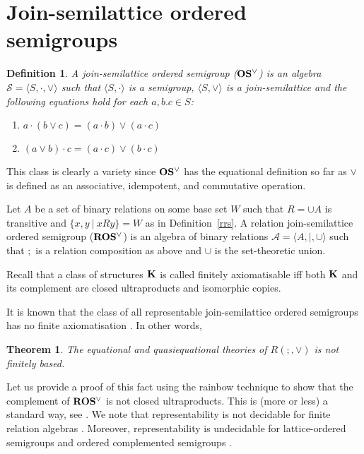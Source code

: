 \documentclass[a4paper]{article}
\theoremstyle{defin}
\newtheorem{defin}{Definition}
\theoremstyle{theorem}
\newtheorem{theorem}{Theorem}
\theoremstyle{prop}
\theoremstyle{lemma}
\theoremstyle{ex}
\theoremstyle{col}
\begin{document}
\section{Join-semilattice ordered semigroups}

\begin{defin} A join-semilattice ordered semigroup (${\bf OS^{\vee}}$) is an algebra $\mathcal{S} = \langle S, \cdot, \vee \rangle$ such that $\langle S, \cdot \rangle$ is a semigroup, $\langle S, \vee \rangle$ is a join-semilattice and the following equations hold for each $a, b. c \in S$:

  \begin{enumerate}
    \item $a \cdot (b \vee c) = (a \cdot b) \vee (a \cdot c)$
    \item $(a \vee b) \cdot c = (a \cdot c) \vee (b \cdot c)$
  \end{enumerate}
\end{defin}
This class is clearly a variety since ${\bf OS^{\vee}}$ has the equational definition so far as $\vee$ is defined as an associative, idempotent, and commutative operation.

Let $A$ be a set of binary relations on some base set $W$ such that $R = \cup A$ is transitive and $\{ x, y \: | \: x R y \} = W$ as in Definition~\ref{rrs}. A relation join-semilattice ordered semigroup (${\bf ROS^{\vee}}$) is an algebra of binary relations $\mathcal{A} = \langle A, |, \cup \rangle$ such that $;$ is a relation composition as above and $\cup$ is the set-theoretic union.

Recall that a class of structures ${\bf K}$ is called finitely axiomatisable iff both ${\bf K}$ and its complement are closed
ultraproducts and isomorphic copies.

It is known that the class of all representable join-semilattice ordered semigroups has no finite axiomatisation \cite{andreka1989union}. In other words,

\begin{theorem}
  The equational and quasiequational theories of $R(;,\vee)$ is not finitely based.
\end{theorem}

Let us provide a proof of this fact using the rainbow technique \cite{hirsch2002relation} to show that the complement of ${\bf ROS^{\vee}}$ is not closed ultraproducts. This is (more or less) a standard way, see \cite{hodkinson2000axiomatizability}.
We note that representability is not decidable for finite relation algebras \cite{hirsch2001representability}. Moreover, representability is undecidable for lattice-ordered semigroups and ordered complemented semigroups \cite{neuzerling2016undecidability}.
\end{document}
